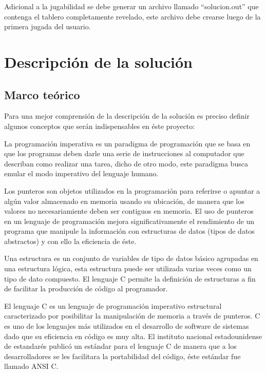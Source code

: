 \documentclass[letterpaper,12pt]{report}
\begin{document}
Adicional a la jugabilidad se debe generar un archivo llamado ``solucion.out'' que contenga el tablero completamente revelado, este archivo debe crearse luego de la primera jugada del usuario.

\chapter{Descripci\'on de la soluci\'on}

\section {Marco te\'orico}

Para una mejor comprensión de la descripción de la solución es preciso definir algunos conceptos que
serán indispensables en éste proyecto:

\begin{description}[align=left]

\item [Programaci\'on imperativa:] 
    La programación imperativa es un paradigma de programación que se basa en que los programas 
    deben darle una serie de instrucciones al computador que describan como realizar una tarea,
    dicho de otro modo, este paradigma busca emular el modo imperativo del lenguaje humano. 

\item [Punteros:]
    Los punteros son objetos utilizados en la programaci\'on para referirse o apuntar a algún valor almacenado
    en memoria usando su ubicación, de manera que los valores no necesariamiente deben ser contiguos en memoria.
    El uso de punteros en un lenguaje de programación mejora significativamente el rendimiento de un programa que 
    manipule la información con estructuras de datos (tipos de datos abstractos) y con ello la eficiencia de éste.

\item [Estructura:]
    Una estructura es un conjunto de variables de tipo de datos básico agrupadas en una estructura lógica, esta estructura puede ser utilizada varias veces como un tipo de dato compuesto. El lenguaje C permite la definición de estructuras a fin de facilitar la producción de código al programador.

\item [Lenguaje de programaci\'on ANSI C:]
    El lenguaje C es un lenguaje de programación imperativo estructural caracterizado por
    posibilitar la manipulación de memoria a través de punteros. C es uno de los lenguajes más
    utilizados en el desarrollo de software de sistemas dado que su eficiencia en código es 
    muy alta. El instituto nacional estadounidense de estandarés publicó un estándar para el 
    lenguaje C de manera que a los desarrolladores se les facilitara la portabilidad del código,
    éste estándar fue llamado ANSI C.

\end{description}
\end{document}
